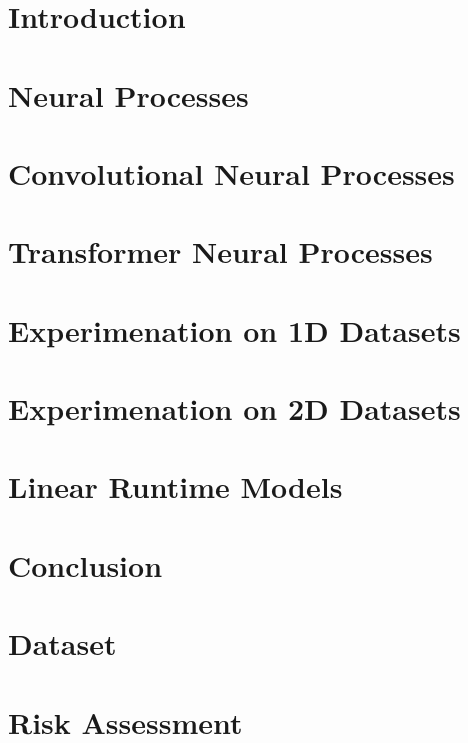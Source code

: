 \documentclass[12pt]{report}
\date{\today}
\begin{document}
\createnotestitlepage 



\chapter{Introduction}


\chapter{Neural Processes}


\chapter{Convolutional Neural Processes}


\chapter{Transformer Neural Processes}



\chapter{Experimenation on 1D Datasets}


\chapter{Experimenation on 2D Datasets}


\chapter{Linear Runtime Models}


\chapter{Conclusion}
% 


\printbibliography[heading=bibintoc]{}



\newpage
 

\begin{appendices}

\chapter{Dataset}

\chapter{Risk Assessment}


\end{appendices}
\end{document}
